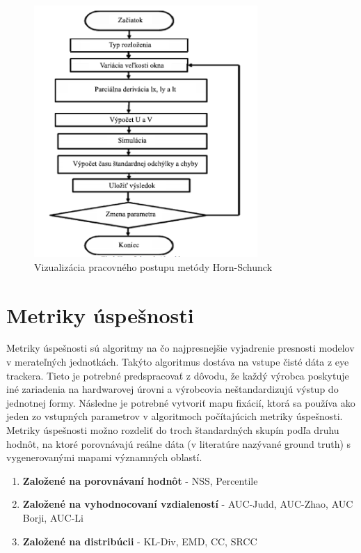 \begin{figure}[H]
  \centering
  \includegraphics[width=8.5cm]{pics/horn-schunck.png}
  \caption{Vizualizácia pracovného postupu metódy Horn-Schunck\cite{horn-schunck}}
\end{figure}
\vspace{10mm}

\section{Metriky úspešnosti}
Metriky úspešnosti sú algoritmy na čo najpresnejšie vyjadrenie presnosti modelov v merateľných jednotkách.
Takýto algoritmus dostáva na vstupe čisté dáta z eye trackera.
Tieto je potrebné predspracovať z dôvodu, že každý výrobca poskytuje iné zariadenia na hardwarovej úrovni a výrobcovia neštandardizujú výstup do jednotnej formy.
Následne je potrebné vytvoriť mapu fixácií, ktorá sa používa ako jeden zo vstupných parametrov v algoritmoch počítajúcich metriky úspešnosti.
\\
Metriky úspešnosti možno rozdeliť do troch štandardných skupín podľa druhu hodnôt, na ktoré porovnávajú reálne dáta (v literatúre nazývané ground truth) s vygenerovanými mapami významných oblastí\cite{metrics-1}.
\begin{enumerate}
  \item\textbf{Založené na porovnávaní hodnôt} - NSS, Percentile
  \item\textbf{Založené na vyhodnocovaní vzdialeností} - AUC-Judd, AUC-Zhao, AUC Borji, AUC-Li
  \item\textbf{Založené na distribúcii} - KL-Div, EMD, CC, SRCC
\end{enumerate}

